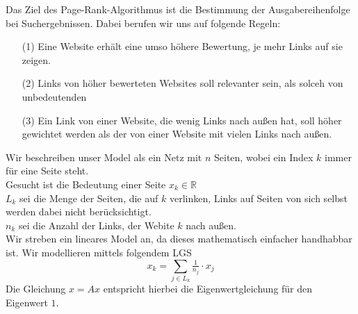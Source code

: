 \begin{egbox}
    Das Ziel des Page-Rank-Algorithmus ist die Bestimmung der Ausgabereihenfolge bei Suchergebnissen. Dabei berufen 
    wir uns auf folgende Regeln:
    \begin{enumerate}
        \item[(1)] Eine Website erhält eine umso höhere Bewertung, je mehr Links auf sie zeigen.
        \item[(2)] Links von höher bewerteten Websites soll relevanter sein, als solceh von unbedeutenden
        \item[(3)] Ein Link von einer Website, die wenig Links nach außen hat, soll höher gewichtet werden als der
            von einer Website mit vielen Links nach außen. 
    \end{enumerate}
    Wir beschreiben unser Model als ein Netz mit $n$ Seiten, wobei ein Index $k$ immer für eine Seite steht. \\
    Gesucht ist die Bedeutung einer Seite $x_k\in\mathbb{R}$ \\
    $L_k$ sei die Menge der Seiten, die auf $k$ verlinken, Links auf Seiten von sich selbst werden dabei nicht
    berücksichtigt. \\
    $n_k$ sei die Anzahl der Links, der Webite $k$ nach außen.\\
    Wir streben ein lineares Model an, da dieses mathematisch einfacher handhabbar ist. Wir modellieren mittels
    folgendem LGS
    \[x_k = \sum_{j\in L_k}\tfrac{1}{n_j}\cdot x_j\]
    Die Gleichung $x=Ax$ entspricht hierbei die Eigenwertgleichung für den Eigenwert $1$.
\end{egbox}
